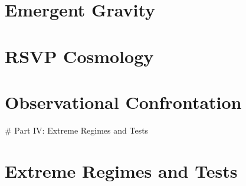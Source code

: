 \documentclass[11pt]{book}
\begin{document}
\mainmatter

\part{Emergent Gravity}





\part{RSVP Cosmology}






\part{Observational Confrontation}





# Part IV: Extreme Regimes and Tests
\part{Extreme Regimes and Tests}




\appendix






\backmatter
\printbibliography
\end{document}
